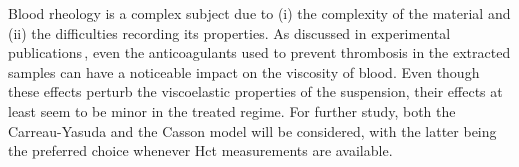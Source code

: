 \begin{tcolorbox}[conclusions]

	Blood rheology is a complex subject due to (i) the complexity of the material and (ii) the difficulties recording its properties. As discussed in experimental publications\,\cite{Suzuki2021}, even the anticoagulants used to prevent thrombosis in the extracted samples can have a noticeable impact on the viscosity of blood. Even though these effects perturb the viscoelastic properties of the suspension, their effects at least seem to be minor in the treated regime. For further study, both the Carreau-Yasuda and the Casson model will be considered, with the latter being the preferred choice whenever Hct measurements are available.
\end{tcolorbox}



